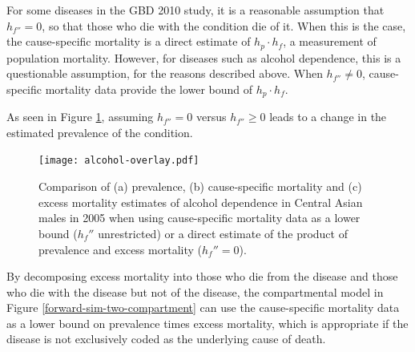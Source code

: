 For some diseases in the GBD 2010 study, it is a reasonable assumption
that $h_{f''} = 0$, so that those who die with the condition die of
it.  When this is the case, the cause-specific mortality is a direct
estimate of $h_{p} \cdot h_{f}$, a measurement of population
mortality.  However, for diseases such as alcohol dependence, this is
a questionable assumption, for the reasons described above.  When
$h_{f''} \neq 0$, cause-specific mortality data provide the lower
bound of $h_{p} \cdot h_{f}$.

As seen in Figure \ref{fig:app-alcohol compare}, assuming $h_{f''}=0$
versus $h_{f''}\geq 0$ leads to a change in the estimated prevalence
of the condition.

    \begin{figure}[h]
        \begin{center}
            \texttt{[image: alcohol-overlay.pdf]}
            \caption{Comparison of (a) prevalence,
              (b) cause-specific mortality and (c) excess
              mortality estimates of alcohol
              dependence in Central Asian males in 2005 when using
              cause-specific mortality data as a lower bound ($h_f''$ unrestricted)
              or a direct estimate of the product of
              prevalence and excess mortality ($h_f'' = 0$).}
            \label{fig:app-alcohol compare}
        \end{center}
    \end{figure}

By decomposing excess mortality into those who die from the
disease and those who die with the disease but not of the disease, the
compartmental model in Figure \ref{forward-sim-two-compartment} can
use the cause-specific mortality data as a lower bound on prevalence
times excess mortality, which is appropriate if the
disease is not exclusively coded as the underlying cause of death.
